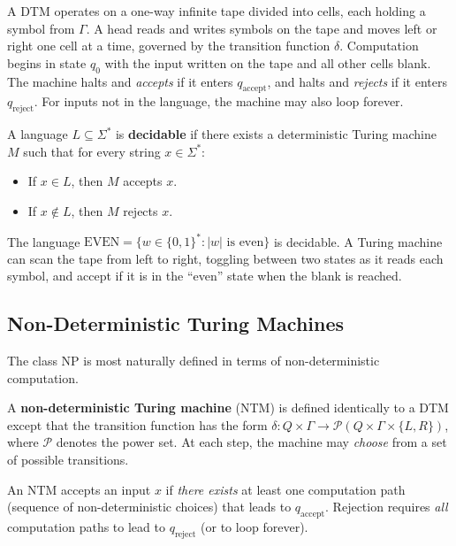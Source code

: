 A DTM operates on a one-way infinite tape divided into cells, each holding a symbol from $\Gamma$. A head reads and writes symbols on the tape and moves left or right one cell at a time, governed by the transition function $\delta$. Computation begins in state $q_0$ with the input written on the tape and all other cells blank. The machine halts and \emph{accepts} if it enters $q_{\text{accept}}$, and halts and \emph{rejects} if it enters $q_{\text{reject}}$. For inputs not in the language, the machine may also loop forever.

\begin{definition}
A language $L \subseteq \Sigma^*$ is \textbf{decidable} if there exists a deterministic Turing machine $M$ such that for every string $x \in \Sigma^*$:
\begin{itemize}
  \item If $x \in L$, then $M$ accepts $x$.
  \item If $x \notin L$, then $M$ rejects $x$.
\end{itemize}
\end{definition}

\begin{example}
The language $\text{EVEN} = \{w \in \{0,1\}^* : |w| \text{ is even}\}$ is decidable. A Turing machine can scan the tape from left to right, toggling between two states as it reads each symbol, and accept if it is in the ``even'' state when the blank is reached.
\end{example}

\subsection{Non-Deterministic Turing Machines}

The class NP is most naturally defined in terms of non-deterministic computation.

\begin{definition}
A \textbf{non-deterministic Turing machine} (NTM) is defined identically to a DTM except that the transition function has the form $\delta: Q \times \Gamma \to \mathcal{P}(Q \times \Gamma \times \{L, R\})$, where $\mathcal{P}$ denotes the power set. At each step, the machine may \emph{choose} from a set of possible transitions.
\end{definition}

An NTM accepts an input $x$ if \emph{there exists} at least one computation path (sequence of non-deterministic choices) that leads to $q_{\text{accept}}$. Rejection requires \emph{all} computation paths to lead to $q_{\text{reject}}$ (or to loop forever).

